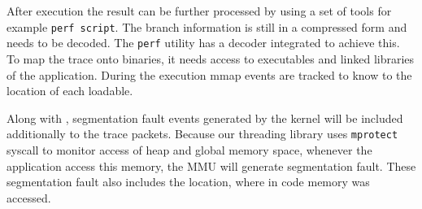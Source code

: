 After execution the result can be further processed by using a set of tools
for example {\tt perf script}. The branch information is still in a compressed
form and needs to be decoded. The {\tt perf} utility has a decoder integrated to achieve this.
To map the trace onto binaries, it needs access to executables and linked
libraries of the application. During the execution mmap events are tracked to
know to the location of each loadable.




Along with \intelpt, segmentation fault events generated by the kernel will be included
additionally to the trace packets. Because our threading library uses {\tt mprotect}
syscall to monitor access of heap and global memory space, whenever the
application access this memory, the MMU will generate segmentation fault. These
segmentation fault also includes the location, where in code memory was accessed.





